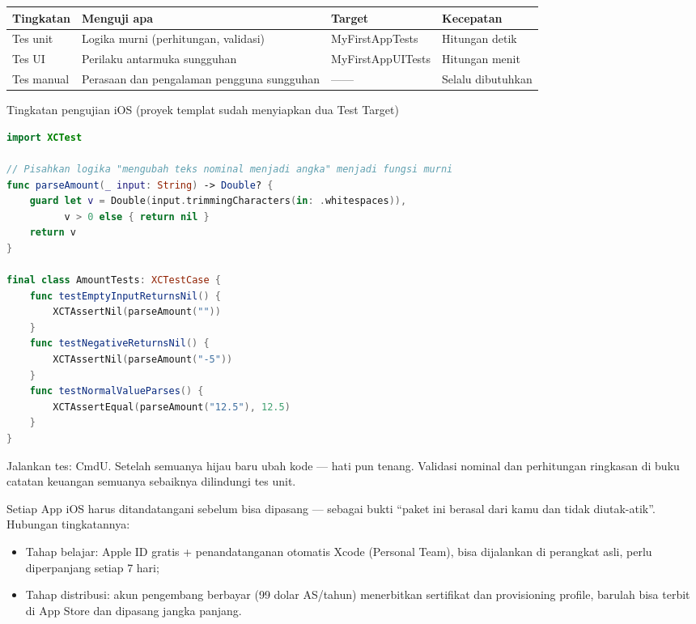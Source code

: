 \begin{center}
\begin{tabularx}{\linewidth}{|X|X|X|X|}
\hline
\textbf{Tingkatan} & \textbf{Menguji apa} & \textbf{Target} & \textbf{Kecepatan} \tabularnewline
\hline
Tes unit & Logika murni (perhitungan, validasi) & MyFirstAppTests & Hitungan detik \tabularnewline
Tes UI & Perilaku antarmuka sungguhan & MyFirstAppUITests & Hitungan menit \tabularnewline
Tes manual & Perasaan dan pengalaman pengguna sungguhan & —— & Selalu dibutuhkan \tabularnewline
\hline
\end{tabularx}
\end{center}

\begin{center}\small\color{gray}Tingkatan pengujian iOS (proyek templat sudah menyiapkan dua Test Target)\end{center}

\begin{lstlisting}[language=Swift]
import XCTest

// Pisahkan logika "mengubah teks nominal menjadi angka" menjadi fungsi murni
func parseAmount(_ input: String) -> Double? {
    guard let v = Double(input.trimmingCharacters(in: .whitespaces)),
          v > 0 else { return nil }
    return v
}

final class AmountTests: XCTestCase {
    func testEmptyInputReturnsNil() {
        XCTAssertNil(parseAmount(""))
    }
    func testNegativeReturnsNil() {
        XCTAssertNil(parseAmount("-5"))
    }
    func testNormalValueParses() {
        XCTAssertEqual(parseAmount("12.5"), 12.5)
    }
}
\end{lstlisting}

Jalankan tes: CmdU. Setelah semuanya hijau baru ubah kode — hati pun tenang. Validasi nominal dan perhitungan ringkasan di buku catatan keuangan semuanya sebaiknya dilindungi tes unit.


Setiap App iOS harus ditandatangani sebelum bisa dipasang — sebagai bukti “paket ini berasal dari kamu dan tidak diutak-atik”. Hubungan tingkatannya:

\begin{itemize}
  \item Tahap belajar: Apple ID gratis + penandatanganan otomatis Xcode (Personal Team), bisa dijalankan di perangkat asli, perlu diperpanjang setiap 7 hari;
  \item Tahap distribusi: akun pengembang berbayar (99 dolar AS/tahun) menerbitkan sertifikat dan provisioning profile, barulah bisa terbit di App Store dan dipasang jangka panjang.
\end{itemize}

